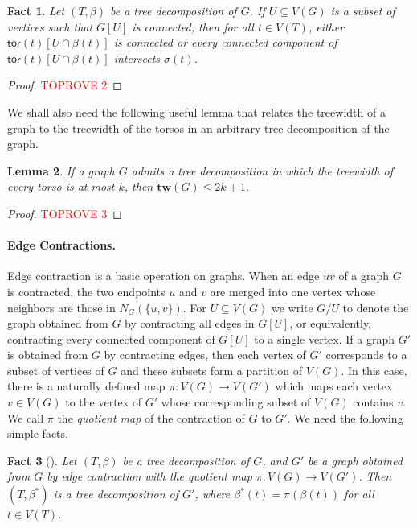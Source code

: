\documentclass[a4paper,11pt]{article}
\newtheorem{lemma}{Lemma}
\numberwithin{lemma}{section}
\newtheorem{fact}[lemma]{Fact}
\newcommand{\tw}{\mathbf{tw}}
\newcommand{\tor}{\mathsf{tor}}
\begin{document}
\begin{fact}\label{fact-connintorso}
 Let $(T,\beta)$ be a tree decomposition of $G$.
 If $U \subseteq V(G)$ is a subset of vertices such that $G[U]$ is connected, then for all $t \in V(T)$, either $\tor(t)[U \cap \beta(t)]$ is connected or every connected component of $\tor(t)[U \cap \beta(t)]$ intersects $\sigma(t)$.
\end{fact}

\begin{proof}\textcolor{red}{TOPROVE 2}\end{proof}

We shall also need the following useful lemma that relates the treewidth of a graph to the treewidth of the torsos in an arbitrary tree decomposition of the graph.

\begin{lemma} \label{lem-torsotw}
 If a graph $G$ admits a tree decomposition in which the treewidth of every torso is at most $k$, then $\tw(G) \leq 2k+1$.
\end{lemma}
\begin{proof}\textcolor{red}{TOPROVE 3}\end{proof}

\paragraph{Edge Contractions.}
Edge contraction is a basic operation on graphs.
When an edge $uv$ of a graph $G$ is contracted, the two endpoints $u$ and $v$ are merged into one vertex whose neighbors are those in $N_G(\{u,v\})$.
For $U \subseteq V(G)$ we write $G/U$ to denote the graph obtained from $G$ by contracting all edges in $G[U]$, or equivalently, contracting every connected component of $G[U]$ to a single vertex.
If a graph $G'$ is obtained from $G$ by contracting edges, then each vertex of $G'$ corresponds to a subset of vertices of $G$ and these subsets form a partition of $V(G)$.
In this case, there is a naturally defined map $\pi\colon V(G) \rightarrow V(G')$ which maps each vertex $v \in V(G)$ to the vertex of $G'$ whose corresponding subset of $V(G)$ contains $v$.
We call $\pi$ the \emph{quotient map} of the contraction of $G$ to $G'$.
We need the following simple facts.

\begin{fact}[\cite{BandyapadhyayLLSX24}]\label{fact-inducedtd}
 Let $(T,\beta)$ be a tree decomposition of $G$, and $G'$ be a graph obtained from $G$ by edge contraction with the quotient map $\pi\colon V(G) \rightarrow V(G')$.
 Then $(T,\beta^*)$ is a tree decomposition of $G'$, where $\beta^*(t) = \pi(\beta(t))$ for all $t \in V(T)$.
\end{fact}
\end{document}
